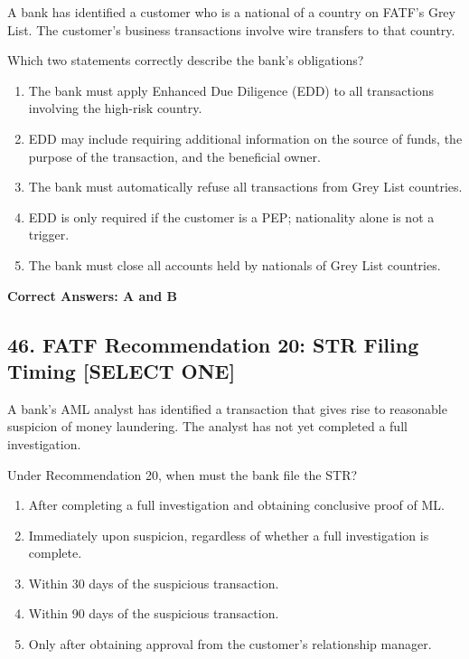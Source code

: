 \documentclass[11pt,a4paper]{article}
\begin{document}
	A bank has identified a customer who is a national of a country on FATF's Grey List. The customer's business transactions involve wire transfers to that country.
	
	Which two statements correctly describe the bank's obligations?
	
	\begin{enumerate}[label=\Alph*.]
		\item The bank must apply Enhanced Due Diligence (EDD) to all transactions involving the high-risk country.
		\item EDD may include requiring additional information on the source of funds, the purpose of the transaction, and the beneficial owner.
		\item The bank must automatically refuse all transactions from Grey List countries.
		\item EDD is only required if the customer is a PEP; nationality alone is not a trigger.
		\item The bank must close all accounts held by nationals of Grey List countries.
	\end{enumerate}
	
	\textbf{Correct Answers: A and B}
	
	\subsection{46. FATF Recommendation 20: STR Filing Timing \textnormal{[SELECT ONE]}}
	
	A bank's AML analyst has identified a transaction that gives rise to reasonable suspicion of money laundering. The analyst has not yet completed a full investigation.
	
	Under Recommendation 20, when must the bank file the STR?
	
	\begin{enumerate}[label=\Alph*.]
		\item After completing a full investigation and obtaining conclusive proof of ML.
		\item Immediately upon suspicion, regardless of whether a full investigation is complete.
		\item Within 30 days of the suspicious transaction.
		\item Within 90 days of the suspicious transaction.
		\item Only after obtaining approval from the customer's relationship manager.
	\end{enumerate}
	
\end{document}
